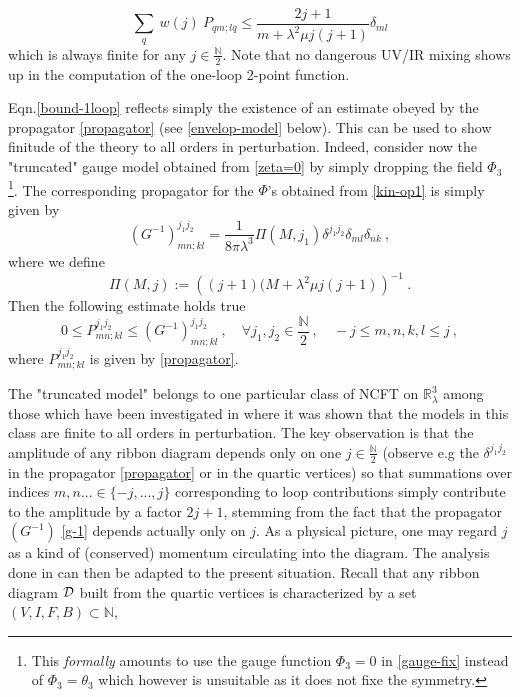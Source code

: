 \documentclass[a4paper,11pt,twoside]{article}
\numberwithin{equation}{section}
\theoremstyle{nonumberplain}
\begin{document}
%
\begin{equation}
\sum_q \ w(j) \ P_{qm;lq} \le \frac{2j+1}{m+\lambda^2\mu j(j+1)} \delta_{ml} \label{bound-1loop}
\end{equation}
%
which is always finite for any $j\in\frac{\mathbb{N}}{2}$. Note that no dangerous UV/IR mixing shows up in the computation of the one-loop 2-point function.\par %
%
Eqn.\eqref{bound-1loop} reflects simply the existence of an estimate obeyed by the propagator \eqref{propagator} (see \eqref{envelop-model} below). This can be used to show finitude of the theory to all orders in perturbation. Indeed, consider now the "truncated" gauge model obtained from \eqref{zeta=0} by simply dropping the field $\Phi_3${\footnote{This {\it{formally}} amounts to use the gauge function $\Phi_3=0$ in \eqref{gauge-fix} instead of $\Phi_3=\theta_3$ which however is unsuitable as it does not fixe the symmetry.}}. The corresponding propagator for the $\Phi$'s obtained from \eqref{kin-op1} is simply given by%
%
\begin{equation} 
(G^{-1})^{j_1j_2}_{mn;kl} = \frac{1}{8\pi\lambda^3} \Pi(M,j_1) \delta^{j_1j_2}\delta_{ml}\delta_{nk} \ , \label{g-1}
\end{equation}
%
where we define%
%
\begin{equation}
\Pi(M,j) := \left((j+1)(M+\lambda^2\mu j(j+1)\right)^{-1} \ . \label{Pi}
\end{equation}
%
Then the following estimate holds true%
%
\begin{equation}
0\le P^{j_1j_2}_{mn;kl}\le(G^{-1})^{j_1j_2}_{mn;kl} \ , \quad \forall j_1,j_2\in\frac{\mathbb{N}}{2}\ , \quad -j\le m,n,k,l\le j \ ,\label{envelop-model}
\end{equation}
where $P^{j_1j_2}_{mn;kl}$ is given by \eqref{propagator}. \par%
%
The "truncated model" belongs to one particular class of NCFT on $\mathbb{R}^3_\lambda$ among those which have been investigated in \cite{vit-wal-12} where it was shown that the models in this class are finite to all orders in perturbation. The key observation is that the amplitude of any ribbon diagram depends only on one $j\in\frac{\mathbb{N}}{2}$ (observe e.g the $\delta^{j_1j_2}$ in the propagator \eqref{propagator} or in the quartic vertices) so that summations over indices $m,n...\in\{-j,...,j\}$ corresponding to loop contributions simply contribute to the amplitude by a factor $2j+1$, stemming from the fact that the propagator $(G^{-1})$ \eqref{g-1} depends actually only on $j$. As a physical picture, one may regard $j$ as a kind of (conserved) momentum circulating into the diagram. The analysis done in \cite{vit-wal-12} can then be adapted to the present situation. Recall that any ribbon diagram ${\cal{D}}$ built from the quartic vertices is characterized by a set $(V,I,F,B)\subset\mathbb{N}$, 
\end{document}
